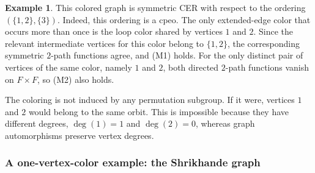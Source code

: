 \documentclass[12pt]{amsart}
\theoremstyle{plain}
\theoremstyle{definition}
\newtheorem{example}[theorem]{Example}
\theoremstyle{remark}
\newcommand{\1}{\mathbf{1}}
\begin{document}
\begin{example}
This colored graph is symmetric CER with respect to the ordering $(\{1,2\},\{3\})$. Indeed, this ordering is a cpeo. The only extended-edge color that occurs more than once is the loop color shared by vertices $1$ and $2$. Since the relevant intermediate vertices for this color belong to $\{1,2\}$, the corresponding symmetric $2$-path functions agree, and (M1) holds. For the only distinct pair of vertices of the same color, namely $1$ and $2$, both directed $2$-path functions vanish on $F\times F$, so (M2) also holds.

The coloring is not induced by any permutation subgroup. If it were, vertices $1$ and $2$ would belong to the same orbit. This is impossible because they have different degrees, $\deg(1)=1$ and $\deg(2)=0$, whereas graph automorphisms preserve vertex degrees.
\end{example}

\subsubsection{A one-vertex-color example: the Shrikhande graph}
\end{document}
